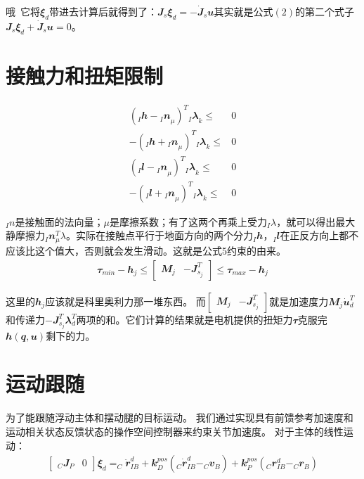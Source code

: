 哦~它将${\mathbfit \xi}_d$带进去计算后就得到了：${\mathbfit J}_s  {\mathbfit \xi}_d  = - \dot {\mathbfit J}_s {\mathbfit u}$其实就是公式$(2)$的第二个式子${\mathbfit J}_s  {\mathbfit \xi}_d  + \dot {\mathbfit J}_s {\mathbfit u} = 0$。

\section{接触力和扭矩限制}

\begin{align}
(_I{\mathbfit h} - {_I{\mathbfit n}}_{\mu})^T {_I{\mathbfit \lambda}}_k\leq & 0 \\
- (_I{\mathbfit h} + {_I{\mathbfit n}}_{\mu})^T {_I{\mathbfit \lambda}}_k\leq & 0 \\
(_I{\mathbfit l} - {_I{\mathbfit n}}_{\mu})^T {_I{\mathbfit \lambda}}_k\leq & 0 \\
- (_I{\mathbfit l} + {_I{\mathbfit n}}_{\mu})^T {_I{\mathbfit \lambda}}_k\leq & 0
\end{align}

$_In$是接触面的法向量；$\mu$是摩擦系数；有了这两个再乘上受力$_I\lambda$，就可以得出最大静摩擦力$_I{\mathbfit n}_{\mu}^T \lambda$。实际在接触点平行于地面方向的两个分力$_I{\mathbfit h}$，$_I{\mathbfit l}$在正反方向上都不应该比这个值大，否则就会发生滑动。这就是公式5约束的由来。
\begin{align}
    {\mathbfit \tau}_{min}-{\mathbfit h}_j 
    \leq \begin{bmatrix} {\mathbfit M}_j & -{\mathbfit J}^T_{s_j} \end{bmatrix} 
    \leq {\mathbfit \tau}_{max}-{\mathbfit h}_j 
\end{align}

这里的${\mathbfit h}_j$应该就是科里奥利力那一堆东西。
而$\begin{bmatrix} {\mathbfit M}_j & -{\mathbfit J}^T_{s_j} \end{bmatrix}$就是加速度力${\mathbfit M}_j  \dot{\mathbfit u}_d^T$和传递力$-{\mathbfit J}^T_{s_j} {\mathbfit \lambda}_d^T$两项的和。它们计算的结果就是电机提供的扭矩力${\mathbfit \tau}$克服完${\mathbfit h}({\mathbfit q}, {\mathbfit u})$剩下的力。

\section{运动跟随}
为了能跟随浮动主体和摆动腿的目标运动。
我们通过实现具有前馈参考加速度和运动相关状态反馈状态的操作空间控制器来约束关节加速度。
对于主体的线性运动：
\begin{align}
    \begin{bmatrix}
    _C{\mathbfit J}_P & {\mathbfit 0}
    \end{bmatrix} 
    {\mathbfit \xi}_d = _C\ddot {\mathbfit r}_{IB}^d 
    + {\mathbfit k}_D^{pos}(_C \dot{\mathbfit r}_{IB}^d-_C{\mathbfit v}_B) 
    + {\mathbfit k}_P^{pos}(_C{\mathbfit r}_{IB}^d-_C{\mathbfit r}_B)
\end{align}

